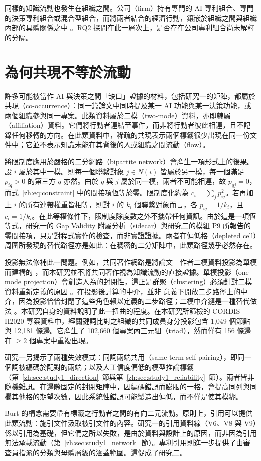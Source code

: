 同樣的知識流動也發生在組織之間。公司（firm）持有專門的 AI 專利組合、專門的決策專利組合或混合型組合，而將兩者結合的經濟行動，鑲嵌於組織之間與組織內部的具體關係之中 \citep{granovetter1985economic}。RQ2 探問在此一層次上，是否存在公司專利組合尚未解釋的分隔。

\section{為何共現不等於流動}
\label{zh:sec:theory_cooccurrence}

許多可能被當作 AI 與決策之間「缺口」證據的材料，包括研究一的矩陣，都屬於共現（co-occurrence）：同一篇論文中同時提及某一 AI 功能與某一決策功能，或兩個組織參與同一專案。此類資料屬於二模（two-mode）資料，亦即隸屬（affiliation）資料。它們將行動者連結至事件，而非將行動者彼此相連，且不記錄任何移轉的方向。在此類資料中，稀疏的共現表示兩個標籤很少出現在同一份文件中；它並不表示知識未能在其背後的人或組織之間流動（flow）。

將限制度應用於嚴格的二分網路（bipartite network）會產生一項形式上的後果。設 $i$ 屬於其中一模。則每一個聯繫對象 $j \in N(i)$ 皆屬於另一模，每一個滿足 $p_{iq} > 0$ 的第三方 $q$ 亦然。由於 $q$ 與 $j$ 屬於同一模，兩者不可能相連，故 $p_{qj} = 0$，而式~\eqref{zh:eq:constraint} 中的間接項恆等於零。限制度化約為 $c_i = \sum_{j} p_{ij}^{2}$。若再加上 $i$ 的所有連帶權重皆相等，則對 $i$ 的 $k_i$ 個聯繫對象而言，各 $p_{ij} = 1/k_i$，且 $c_i = 1/k_i$。在此等權條件下，限制度除度數之外不攜帶任何資訊。由於這是一項恆等式，研究一的 Gap Validity 附屬分析（sidecar）與研究二的模組 P9 所報告的零間接項，只是對程式實作的檢查，而非實證證據。兩者在偏低格（depleted cell）周圍所發現的替代路徑亦是如此：在稠密的二分矩陣中，此類路徑幾乎必然存在。

投影無法修補此一問題。例如，共同著作網路是將論文—作者二模資料投影為單模而建構的 \citep{newman2001scientific}，而本研究並不將共同著作視為知識流動的直接證據。單模投影（one-mode projection）會創造人為的封閉性，這正是群聚（clustering）必須針對二模資料重新定義的原因 \citep{opsahl2013triadic}。在投影後計算的中介，並非 \citet{gould1989structures} 意義下開放二步路徑上的中介，因為投影恰恰封閉了這些角色賴以定義的二步路徑；二模中介鏈是一種替代做法 \citep{jasny2015two}。本研究自身的資料說明了此一扭曲的程度。在本研究所篩檢的 CORDIS H2020 專案資料中，經關鍵詞比對之組織的共同成員身分投影包含 1,049 個節點與 12,181 條邊。它產生了 102,660 個專案內三元組（triad），然而僅有 156 條邊在 $\geq 2$ 個專案中重複出現。

研究一另揭示了兩種失效模式：同詞兩端共用（same-term self-pairing），即同一個詞被編碼於配對的兩端；以及人工信度偏低的模型推論標籤（第~\ref{zh:sec:study1_direction}~節與第~\ref{zh:sec:study1_reliability}~節）。兩者皆非隨機雜訊。在邊際固定的封閉矩陣中，因編碼錯誤而膨脹的一格，會提高同列與同欄其他格的期望次數，因此系統性錯誤可能製造出偏低，而不僅是使其模糊。

Burt 的構念需要帶有標籤之行動者之間的有向二元流動。原則上，引用可以提供此類流動：施引文件汲取被引文件的內容。研究一的引用資料線（V6、V8 與 V9）係以引用為基礎，但它們之所以失敗，是由於資料與設計上的原因，而非因為引用無法承載流動（第~\ref{zh:sec:study1_network}~節）。專利引用則進一步提供了由審查員指派的分類與母體層級的涵蓋範圍。這促成了研究二。
